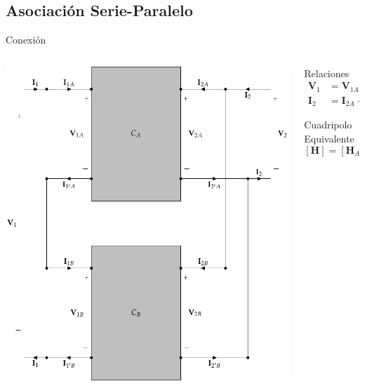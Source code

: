 \documentclass[xcolor={usenames,svgnames,dvipsnames}]{beamer}
\begin{document}
\subsection{Asociación Serie-Paralelo}
\label{sec:orgbd10eb0}
\begin{frame}[label={sec:orgde2eca9}]{Conexión}
\begin{columns}
\begin{column}{0.7\columnwidth}
\begin{center}
\includegraphics[height=0.75\textheight]{figs/serie-paralelo.pdf}
\end{center}
\end{column}
\begin{column}{0.35\columnwidth}
\begin{block}{Relaciones}
\begin{align*}
  \mathbf{V}_1 &= \mathbf{V}_{1A} + \mathbf{V}_{1B}\\
  \mathbf{I}_2 &= \mathbf{I}_{2A} + \mathbf{I}_{2B}
\end{align*}
\end{block}

\begin{block}{Cuadripolo Equivalente}
\[
  \boxed{[\mathbf{H}] = [\mathbf{H}_A] + [\mathbf{H}_B]}
\]
\end{block}
\end{column}
\end{columns}
\end{frame}
\end{document}
